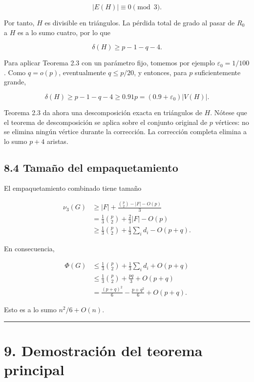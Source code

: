 \documentclass[
  11pt,
]{article}
\begin{document}
\[
|E(H)|\equiv0\pmod3.
\]

Por tanto, \(H\) es divisible en triángulos. La pérdida total de grado al pasar de \(R_0\) a \(H\) es a lo sumo cuatro, por lo que

\[
\delta(H)\ge p-1-q-4.
\tag{8.8}
\]

Para aplicar Teorema 2.3 con un parámetro fijo, tomemos por ejemplo \(\varepsilon_0=1/100\). Como \(q=o(p)\), eventualmente \(q\le p/20\), y entonces, para \(p\) suficientemente grande,

\[
\delta(H)\ge p-1-q-4\ge0.91p=(0.9+\varepsilon_0)|V(H)|.
\tag{8.9}
\]

Teorema 2.3 da ahora una descomposición exacta en triángulos de \(H\). Nótese que el teorema de descomposición se aplica sobre el conjunto original de \(p\) vértices: no se elimina ningún vértice durante la corrección. La corrección completa elimina a lo sumo \(p+4\) aristas.

\subsection{8.4 Tamaño del empaquetamiento}\label{tamauxf1o-del-empaquetamiento}

El empaquetamiento combinado tiene tamaño

\[
\begin{aligned}
\nu_3(G)
&\ge
|F|+\frac{\binom p2-|F|-O(p)}3\\
&=
\frac13\binom p2+\frac23|F|-O(p)\\
&\ge
\frac13\binom p2+\frac13\sum_i d_i-O(p+q).
\end{aligned}
\tag{8.10}
\]

En consecuencia,

\[
\begin{aligned}
\Phi(G)
&\le
\frac13\binom p2+\frac13\sum_i d_i+O(p+q)\\
&\le
\frac13\binom p2+\frac{pq}{3}+O(p+q)\\
&=
\frac{(p+q)^2}{6}-\frac{p+q^2}{6}+O(p+q).
\end{aligned}
\tag{8.11}
\]

Esto es a lo sumo \(n^2/6+O(n)\).

\begin{center}\rule{0.5\linewidth}{0.5pt}\end{center}

\section{9. Demostración del teorema principal}\label{demostraciuxf3n-del-teorema-principal}
\end{document}
